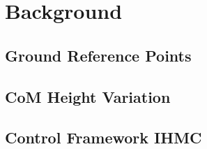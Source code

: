 %
\chapter{Background}

\section{Ground Reference Points}

\section{CoM Height Variation}

\section{Control Framework IHMC}